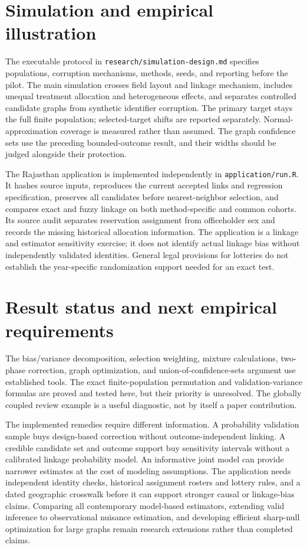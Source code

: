 \documentclass[11pt]{article}
\begin{document}
\section{Simulation and empirical illustration}
The executable protocol in \texttt{research/simulation-design.md} specifies populations,
corruption mechanisms, methods, seeds, and reporting before the pilot. The main
simulation crosses field layout and linkage mechanism, includes unequal treatment
allocation and heterogeneous effects, and separates controlled candidate graphs from
synthetic identifier corruption. The primary target stays the full finite population;
selected-target shifts are reported separately. Normal-approximation coverage is
measured rather than assumed. The graph confidence sets use the preceding bounded-outcome
result, and their widths should be judged alongside their protection.




The Rajasthan application is implemented independently in
\texttt{application/run.R}. It hashes source inputs, reproduces the current accepted
links and regression specification, preserves all candidates before nearest-neighbor
selection, and compares exact and fuzzy linkage on both method-specific and common
cohorts. Its source audit separates reservation assignment from officeholder sex and
records the missing historical allocation information. The application is a linkage
and estimator sensitivity exercise; it does not identify actual linkage bias without
independently validated identities. General legal provisions for lotteries do not
establish the year-specific randomization support needed for an exact test.


\section{Result status and next empirical requirements}
The bias/variance decomposition, selection weighting, mixture calculations,
two-phase correction, graph optimization, and union-of-confidence-sets argument use
established tools. The exact finite-population permutation and validation-variance
formulas are proved and tested here, but their priority is unresolved. The globally
coupled review example is a useful diagnostic, not by itself a paper contribution.

The implemented remedies require different information. A probability validation
sample buys design-based correction without outcome-independent linking. A credible
candidate set and outcome support buy sensitivity intervals without a calibrated
linkage probability model. An informative joint model can provide narrower estimates
at the cost of modeling assumptions. The application needs independent identity checks,
historical assignment rosters and lottery rules, and a dated geographic crosswalk
before it can support stronger causal or linkage-bias claims. Comparing all contemporary
model-based estimators, extending valid inference to observational nuisance estimation,
and developing efficient sharp-null optimization for large graphs remain research
extensions rather than completed claims.
\end{document}
